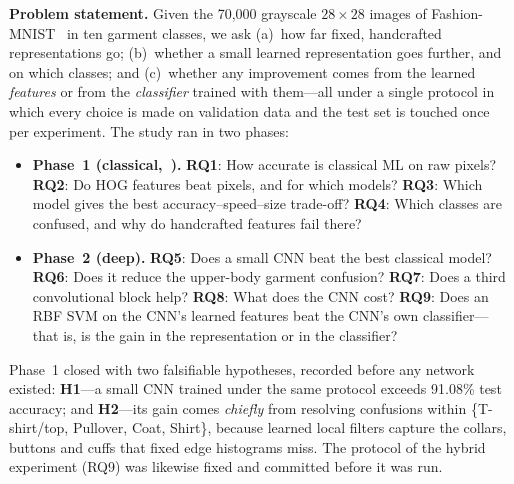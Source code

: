 \documentclass[conference]{IEEEtran}
\newcommand{\RQ}[1]{\textbf{RQ#1}}
\begin{document}
\textbf{Problem statement.} Given the 70{,}000 grayscale $28\times28$ images of Fashion-MNIST~\cite{xiao2017fashion} in ten
garment classes, we ask (a)~how far fixed, handcrafted representations go; (b)~whether a small learned representation
goes further, and on which classes; and (c)~whether any improvement comes from the learned \emph{features} or from the
\emph{classifier} trained with them---all under a single protocol in which every choice is made on validation data and
the test set is touched once per experiment. The study ran in two phases:
\begin{itemize}
  \item \textbf{Phase~1 (classical,~\cite{phase1report}).} \RQ{1}: How accurate is classical ML on raw pixels? \RQ{2}: Do HOG features beat
        pixels, and for which models? \RQ{3}: Which model gives the best accuracy--speed--size trade-off? \RQ{4}: Which
        classes are confused, and why do handcrafted features fail there?
  \item \textbf{Phase~2 (deep).} \RQ{5}: Does a small CNN beat the best classical model? \RQ{6}: Does it reduce the
        upper-body garment confusion? \RQ{7}: Does a third convolutional block help? \RQ{8}: What does the CNN cost?
        \RQ{9}: Does an RBF SVM on the CNN's learned features beat the CNN's own classifier---that is, is the gain in the
        representation or in the classifier?
\end{itemize}
Phase~1 closed with two falsifiable hypotheses, recorded before any network existed:
\textbf{H1}---a small CNN trained under the same protocol exceeds 91.08\% test accuracy; and \textbf{H2}---its gain comes
\emph{chiefly} from resolving confusions within \{T-shirt/top, Pullover, Coat, Shirt\}, because learned local filters
capture the collars, buttons and cuffs that fixed edge histograms miss. The protocol of the hybrid experiment (RQ9) was
likewise fixed and committed before it was run.
\end{document}

